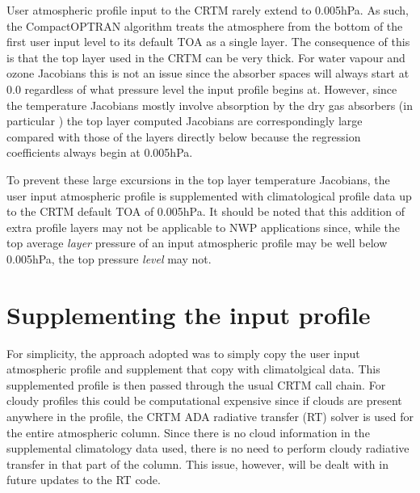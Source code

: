 User atmospheric profile input to the CRTM rarely extend to 0.005hPa. As such, the CompactOPTRAN algorithm treats the atmosphere from the bottom of the first user input level to its default TOA as a single layer. The consequence of this is that the top layer used in the CRTM can be very thick. For water vapour and ozone Jacobians this is not an issue since the absorber spaces will always start at 0.0 regardless of what pressure level the input profile begins at. However, since the temperature Jacobians mostly involve absorption by the dry gas absorbers (in particular \carbondioxide) the top layer computed Jacobians are correspondingly large compared with those of the layers directly below because the regression coefficients always begin at 0.005hPa.

To prevent these large excursions in the top layer temperature Jacobians, the user input atmospheric profile is supplemented with climatological profile data up to the CRTM default TOA of 0.005hPa. It should be noted that this addition of extra profile layers may not be applicable to NWP applications since, while the top average \emph{layer} pressure of an input atmospheric profile may be well below 0.005hPa, the top pressure \emph{level} may not.


\section{Supplementing the input profile}
For simplicity, the approach adopted was to simply copy the user input atmospheric profile and supplement that copy with climatolgical data. This supplemented profile is then passed through the usual CRTM call chain. For cloudy profiles this could be computational expensive since if clouds are present anywhere in the profile, the CRTM ADA radiative transfer (RT) solver is used for the entire atmospheric column. Since there is no cloud information in the supplemental climatology data used, there is no need to perform cloudy radiative transfer in that part of the column. This issue, however, will be dealt with in future updates to the RT code.


